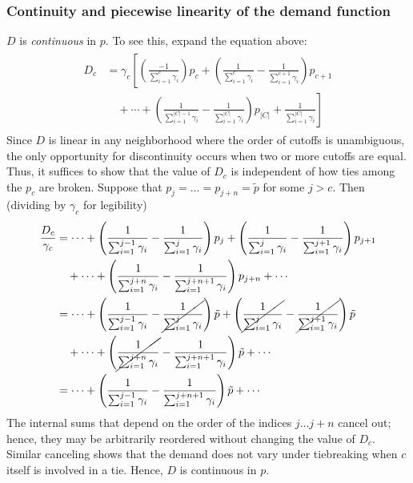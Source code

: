 \documentclass[12pt]{article}
\numberwithin{equation}{subsection}
\theoremstyle{definition}
\begin{document}
\subsubsection{Continuity and piecewise linearity of the demand function} \label{continuityandpiecewiselinearity}
$D$ is \emph{continuous} in $p$. To see this, expand the equation above:
\begin{gather}
\begin{aligned}D_c &= \gamma_c \left[
\left( \frac{-1}{\sum_{i=1}^c \gamma_i}\right) p_c
+ \left(\frac{1}{\sum_{i=1}^{c} \gamma_i} - \frac{1}{\sum_{i=1}^{c+1} \gamma_i} \right) p_{c+1}
\right. \\ &\left.
\quad + \cdots
+ \left(\frac{1}{\sum_{i=1}^{|C|-1} \gamma_i} - \frac{1}{\sum_{i=1}^{|C|} \gamma_i}\right) p_{|C|}
+ \frac{1}{\sum_{i=1}^{|C|} \gamma_i}
\right]
\end{aligned}
\end{gather}
Since $D$ is linear in any neighborhood where the order of cutoffs is unambiguous, the only opportunity for discontinuity occurs when two or more cutoffs are equal. Thus, it suffices to show that the value of $D_c$ is independent of how ties among the $p_c$ are broken. Suppose that $p_j = \dots = p_{j+n} = \tilde p$ for some $j > c$. Then (dividing by $\gamma_c$ for legibility)
\begin{gather}
\begin{aligned}
\frac{D_c}{\gamma_c} &= \cdots
+ \left(\frac{1}{\sum_{i=1}^{j-1} \gamma_i} - \frac{1}{\sum_{i=1}^{j} \gamma_i} \right) p_{j}
+ \left(\frac{1}{\sum_{i=1}^{j} \gamma_i} - \frac{1}{\sum_{i=1}^{j+1} \gamma_i} \right) p_{j+1}
 \\ &\quad + \cdots
+ \left(\frac{1}{\sum_{i=1}^{j+n} \gamma_i} - \frac{1}{\sum_{i=1}^{j+n+1} \gamma_i}\right) p_{j+n}
+ \cdots \\
&= \cdots
+ \left(\frac{1}{\sum_{i=1}^{j-1} \gamma_i} - \cancel{\frac{1}{\sum_{i=1}^{j} \gamma_i}} \right) \tilde p
+ \left(\cancel{\frac{1}{\sum_{i=1}^{j} \gamma_i}} - \cancel{\frac{1}{\sum_{i=1}^{j+1} \gamma_i}} \right) \tilde p
\\ &\quad  + \cdots
+ \left(\cancel{\frac{1}{\sum_{i=1}^{j+n} \gamma_i}} - \frac{1}{\sum_{i=1}^{j+n+1} \gamma_i}\right) \tilde p
+ \cdots \\
&= \cdots
+ \left(\frac{1}{\sum_{i=1}^{j-1} \gamma_i} - \frac{1}{\sum_{i=1}^{j+n+1} \gamma_i}\right) \tilde p
+ \cdots
\end{aligned}
\end{gather}
The internal sums that depend on the order of the indices $j \dots j+n$ cancel out; hence, they may be arbitrarily reordered without changing the value of $D_c$. Similar canceling shows that the demand does not vary under tiebreaking when $c$ itself is involved in a tie. Hence, $D$ is continuous in $p$. 
\end{document}
